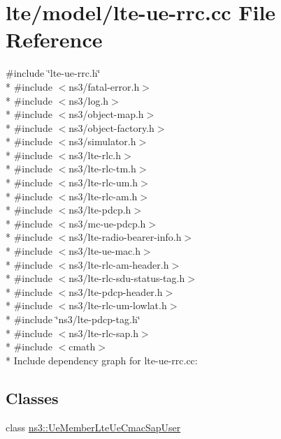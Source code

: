 \hypertarget{lte-ue-rrc_8cc}{}\section{lte/model/lte-\/ue-\/rrc.cc File Reference}
\label{lte-ue-rrc_8cc}
{\ttfamily \#include \char`\"{}lte-\/ue-\/rrc.\+h\char`\"{}}\\*
{\ttfamily \#include $<$ns3/fatal-\/error.\+h$>$}\\*
{\ttfamily \#include $<$ns3/log.\+h$>$}\\*
{\ttfamily \#include $<$ns3/object-\/map.\+h$>$}\\*
{\ttfamily \#include $<$ns3/object-\/factory.\+h$>$}\\*
{\ttfamily \#include $<$ns3/simulator.\+h$>$}\\*
{\ttfamily \#include $<$ns3/lte-\/rlc.\+h$>$}\\*
{\ttfamily \#include $<$ns3/lte-\/rlc-\/tm.\+h$>$}\\*
{\ttfamily \#include $<$ns3/lte-\/rlc-\/um.\+h$>$}\\*
{\ttfamily \#include $<$ns3/lte-\/rlc-\/am.\+h$>$}\\*
{\ttfamily \#include $<$ns3/lte-\/pdcp.\+h$>$}\\*
{\ttfamily \#include $<$ns3/mc-\/ue-\/pdcp.\+h$>$}\\*
{\ttfamily \#include $<$ns3/lte-\/radio-\/bearer-\/info.\+h$>$}\\*
{\ttfamily \#include $<$ns3/lte-\/ue-\/mac.\+h$>$}\\*
{\ttfamily \#include $<$ns3/lte-\/rlc-\/am-\/header.\+h$>$}\\*
{\ttfamily \#include $<$ns3/lte-\/rlc-\/sdu-\/status-\/tag.\+h$>$}\\*
{\ttfamily \#include $<$ns3/lte-\/pdcp-\/header.\+h$>$}\\*
{\ttfamily \#include $<$ns3/lte-\/rlc-\/um-\/lowlat.\+h$>$}\\*
{\ttfamily \#include \char`\"{}ns3/lte-\/pdcp-\/tag.\+h\char`\"{}}\\*
{\ttfamily \#include $<$ns3/lte-\/rlc-\/sap.\+h$>$}\\*
{\ttfamily \#include $<$cmath$>$}\\*
Include dependency graph for lte-\/ue-\/rrc.cc\+:
\subsection*{Classes}
\begin{DoxyCompactItemize}
\item 
class \hyperlink{classns3_1_1UeMemberLteUeCmacSapUser}{ns3\+::\+Ue\+Member\+Lte\+Ue\+Cmac\+Sap\+User}
\end{DoxyCompactItemize}
